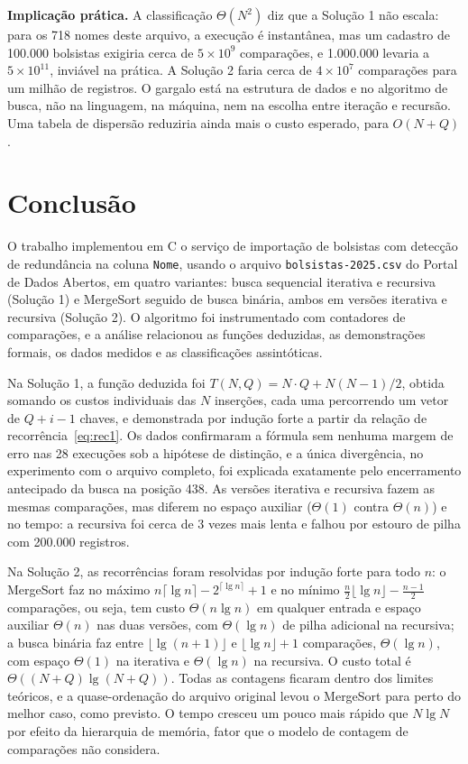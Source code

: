 \documentclass[11pt,a4paper]{article}
\begin{document}
\textbf{Implicação prática.} A classificação $\Theta(N^2)$ diz que a Solução 1 não escala: para os 718 nomes deste arquivo, a execução é instantânea, mas um cadastro de 100.000 bolsistas exigiria cerca de $5\times10^9$ comparações, e 1.000.000 levaria a $5\times10^{11}$, inviável na prática. A Solução 2 faria cerca de $4\times10^7$ comparações para um milhão de registros. O gargalo está na estrutura de dados e no algoritmo de busca, não na linguagem, na máquina, nem na escolha entre iteração e recursão. Uma tabela de dispersão reduziria ainda mais o custo esperado, para $O(N+Q)$.

\section{Conclusão}

O trabalho implementou em C o serviço de importação de bolsistas com detecção de redundância na coluna \texttt{Nome}, usando o arquivo \texttt{bolsistas-2025.csv} do Portal de Dados Abertos, em quatro variantes: busca sequencial iterativa e recursiva (Solução 1) e MergeSort seguido de busca binária, ambos em versões iterativa e recursiva (Solução 2). O algoritmo foi instrumentado com contadores de comparações, e a análise relacionou as funções deduzidas, as demonstrações formais, os dados medidos e as classificações assintóticas.

Na Solução 1, a função deduzida foi $T(N,Q)=N\cdot Q+N(N-1)/2$, obtida somando os custos individuais das $N$ inserções, cada uma percorrendo um vetor de $Q+i-1$ chaves, e demonstrada por indução forte a partir da relação de recorrência~\eqref{eq:rec1}. Os dados confirmaram a fórmula sem nenhuma margem de erro nas 28 execuções sob a hipótese de distinção, e a única divergência, no experimento com o arquivo completo, foi explicada exatamente pelo encerramento antecipado da busca na posição 438. As versões iterativa e recursiva fazem as mesmas comparações, mas diferem no espaço auxiliar ($\Theta(1)$ contra $\Theta(n)$) e no tempo: a recursiva foi cerca de 3 vezes mais lenta e falhou por estouro de pilha com 200.000 registros.

Na Solução 2, as recorrências foram resolvidas por indução forte para todo $n$: o MergeSort faz no máximo $n\lceil\lg n\rceil-2^{\lceil\lg n\rceil}+1$ e no mínimo $\frac n2\lfloor\lg n\rfloor-\frac{n-1}{2}$ comparações, ou seja, tem custo $\Theta(n\lg n)$ em qualquer entrada e espaço auxiliar $\Theta(n)$ nas duas versões, com $\Theta(\lg n)$ de pilha adicional na recursiva; a busca binária faz entre $\lfloor\lg(n+1)\rfloor$ e $\lfloor\lg n\rfloor+1$ comparações, $\Theta(\lg n)$, com espaço $\Theta(1)$ na iterativa e $\Theta(\lg n)$ na recursiva. O custo total é $\Theta((N+Q)\lg(N+Q))$. Todas as contagens ficaram dentro dos limites teóricos, e a quase-ordenação do arquivo original levou o MergeSort para perto do melhor caso, como previsto. O tempo cresceu um pouco mais rápido que $N\lg N$ por efeito da hierarquia de memória, fator que o modelo de contagem de comparações não considera.
\end{document}
